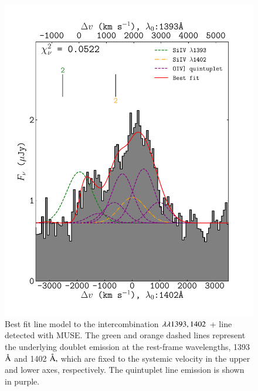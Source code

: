 

\begin{figure} 
\centering
\includegraphics[width=0.55\columnwidth]{plots_chp3/SiIV_fit.pdf}
\caption[ $\lam\lam1393,1402$ + \ion{O}{IV]} intercombination line in MUSE and its best-fit]{Best fit line model to the intercombination  $\lam\lam1393,1402$ + \ion{O}{IV]} line detected with MUSE. The green and orange dashed lines represent the underlying doublet emission at the rest-frame wavelengths, 1393 $\mbox{\normalfont\AA }$ and 1402 $\mbox{\normalfont\AA },$ which are fixed to the systemic velocity in the upper and lower axes, respectively. The \ion{O}{IV]} quintuplet line emission is shown in purple.}
\label{fig:SiIV-line}
\end{figure}

